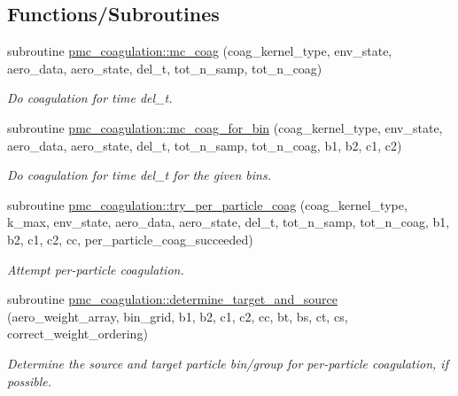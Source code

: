 \subsection*{Functions/\+Subroutines}
\begin{DoxyCompactItemize}
\item 
subroutine \mbox{\hyperlink{namespacepmc__coagulation_ac4aa547a592f79bcd9beed2ed8af6a66}{pmc\+\_\+coagulation\+::mc\+\_\+coag}} (coag\+\_\+kernel\+\_\+type, env\+\_\+state, aero\+\_\+data, aero\+\_\+state, del\+\_\+t, tot\+\_\+n\+\_\+samp, tot\+\_\+n\+\_\+coag)
\begin{DoxyCompactList}\small\item\em Do coagulation for time del\+\_\+t. \end{DoxyCompactList}\item 
subroutine \mbox{\hyperlink{namespacepmc__coagulation_a89d4e9f643d866b066134cfea4b68e0f}{pmc\+\_\+coagulation\+::mc\+\_\+coag\+\_\+for\+\_\+bin}} (coag\+\_\+kernel\+\_\+type, env\+\_\+state, aero\+\_\+data, aero\+\_\+state, del\+\_\+t, tot\+\_\+n\+\_\+samp, tot\+\_\+n\+\_\+coag, b1, b2, c1, c2)
\begin{DoxyCompactList}\small\item\em Do coagulation for time del\+\_\+t for the given bins. \end{DoxyCompactList}\item 
subroutine \mbox{\hyperlink{namespacepmc__coagulation_a8257679dccc3b287cf254bdd9c810aae}{pmc\+\_\+coagulation\+::try\+\_\+per\+\_\+particle\+\_\+coag}} (coag\+\_\+kernel\+\_\+type, k\+\_\+max, env\+\_\+state, aero\+\_\+data, aero\+\_\+state, del\+\_\+t, tot\+\_\+n\+\_\+samp, tot\+\_\+n\+\_\+coag, b1, b2, c1, c2, cc, per\+\_\+particle\+\_\+coag\+\_\+succeeded)
\begin{DoxyCompactList}\small\item\em Attempt per-\/particle coagulation. \end{DoxyCompactList}\item 
subroutine \mbox{\hyperlink{namespacepmc__coagulation_a475dbce9c2097d091a45066282188b3c}{pmc\+\_\+coagulation\+::determine\+\_\+target\+\_\+and\+\_\+source}} (aero\+\_\+weight\+\_\+array, bin\+\_\+grid, b1, b2, c1, c2, cc, bt, bs, ct, cs, correct\+\_\+weight\+\_\+ordering)
\begin{DoxyCompactList}\small\item\em Determine the source and target particle bin/group for per-\/particle coagulation, if possible. \end{DoxyCompactList}\item 

\end{DoxyCompactItemize}
